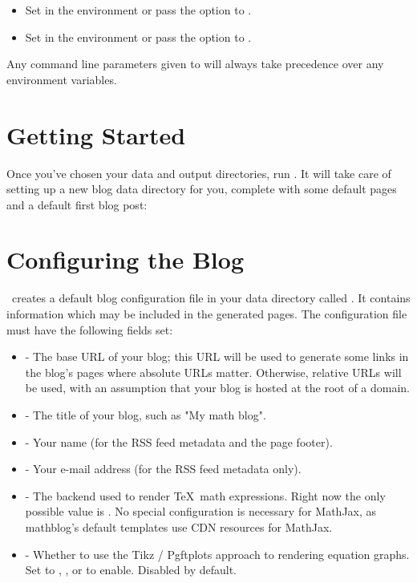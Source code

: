 \documentclass[11pt, letterpaper, oneside, titlepage]{book}
\begin{document}
\begin{itemize}
\item{Set  in the environment or pass the
   option to .}
\item{Set  in the environment or pass the
   option to .}
\end{itemize}

Any command line parameters given to  will always take
precedence over any environment variables.

\section{Getting Started}

Once you've chosen your data and output directories, run .
It will take care of setting up a new blog data directory for you,
complete with some default pages and a default first blog post:


\section{Configuring the Blog}

\mathblog\ creates a default blog configuration file in your data
directory called .  It contains information which may be
included in the generated pages.  The configuration file 
must have the following fields set:

\begin{itemize}
\item{ - The base URL of your blog; this URL will be used
  to generate some links in the blog's pages where absolute URLs
  matter.  Otherwise, relative URLs will be used, with an assumption
  that your blog is hosted at the root of a domain.}
\item{ - The title of your blog, such as "My math blog".}
\item{ - Your name (for the RSS feed metadata and the
  page footer).}
\item{ - Your e-mail address (for the RSS feed
  metadata only).}
\item{ - The backend used to render \TeX\ math
  expressions.  Right now the only possible value is .  No
  special configuration is necessary for MathJax, as mathblog's
  default templates use CDN resources for MathJax.}
\item{ - Whether to use the Tikz / Pgftplots approach to
  rendering equation graphs.  Set to , , or  to
  enable.  Disabled by default.}
\end{itemize}
\end{document}
